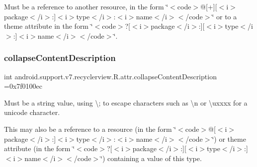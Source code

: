 Must be a reference to another resource, in the form \char`\"{}$<$code$>$@\mbox{[}+\mbox{]}\mbox{[}$<$i$>$package$<$/i$>$\+:\mbox{]}$<$i$>$type$<$/i$>$\+:$<$i$>$name$<$/i$>$$<$/code$>$\char`\"{} or to a theme attribute in the form \char`\"{}$<$code$>$?\mbox{[}$<$i$>$package$<$/i$>$\+:\mbox{]}\mbox{[}$<$i$>$type$<$/i$>$\+:\mbox{]}$<$i$>$name$<$/i$>$$<$/code$>$\char`\"{}. \mbox{\label{classandroid_1_1support_1_1v7_1_1recyclerview_1_1R_1_1attr_a3f7346ed4676d518b47a6a426632c6fc}} 
\subsubsection{\texorpdfstring{collapse\+Content\+Description}{collapseContentDescription}}
{\footnotesize\ttfamily int android.\+support.\+v7.\+recyclerview.\+R.\+attr.\+collapse\+Content\+Description =0x7f0100ec\hspace{0.3cm}{\ttfamily [static]}}

Must be a string value, using \textquotesingle{}\textbackslash{};\textquotesingle{} to escape characters such as \textquotesingle{}\textbackslash{}n\textquotesingle{} or \textquotesingle{}\textbackslash{}uxxxx\textquotesingle{} for a unicode character. 

This may also be a reference to a resource (in the form \char`\"{}$<$code$>$@\mbox{[}$<$i$>$package$<$/i$>$\+:\mbox{]}$<$i$>$type$<$/i$>$\+:$<$i$>$name$<$/i$>$$<$/code$>$\char`\"{}) or theme attribute (in the form \char`\"{}$<$code$>$?\mbox{[}$<$i$>$package$<$/i$>$\+:\mbox{]}\mbox{[}$<$i$>$type$<$/i$>$\+:\mbox{]}$<$i$>$name$<$/i$>$$<$/code$>$\char`\"{}) containing a value of this type. \mbox{\label{classandroid_1_1support_1_1v7_1_1recyclerview_1_1R_1_1attr_a7cfaa293b4e2c7652d0b5bc580dd7d79}} 
